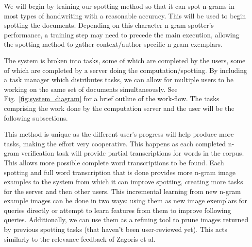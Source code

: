 \documentclass[ms]{byuprop}
\begin{document}
We will begin by training our spotting method so that it can spot n-grams in most types of handwriting with a reasonable accuracy. This will be used to begin spotting the documents. Depending on this character n-gram spotter's performance, a training step may need to precede the main execution, allowing the spotting method to gather context/author specific n-gram exemplars. 

The system is broken into tasks, some of which are completed by the users, some of which are completed by a server doing the computation/spotting. By including a task manager which distributes tasks, we can allow for multiple users to be working on the same set of documents simultaneously. See Fig.~\ref{fig:system_diagram} for a brief outline of the work-flow. The tasks comprising the work done by the computation server and the user will be the following subsections.

This method is unique as the different user's progress will help produce more tasks, making the effort very cooperative. This happens as each completed n-gram verification task will provide partial transcriptions for words in the corpus. This allows more possible complete word transcriptions to be found. Each spotting and full word transcription that is done provides more n-gram image examples to the system from which it can improve spotting, creating more tasks for the server and then other users. This incremental learning from new n-gram example images can be done in two ways: using them as new image exemplars for queries directly or attempt to learn features from them to improve following queries. Additionally, we can use them as a refining tool to prune images returned by previous spotting tasks (that haven't been user-reviewed yet). This acts similarly to the relevance feedback of Zagoris et al\cite{Zagoris2015}.

\end{document}
